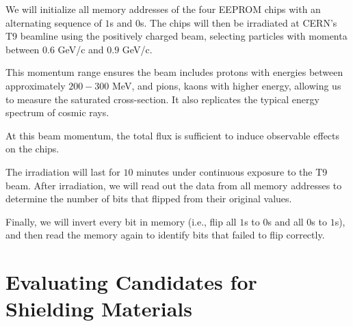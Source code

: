 \documentclass{article}
\begin{document}
We will initialize all memory addresses of the four EEPROM chips with an alternating sequence of $1$s and $0$s. The chips will then be 
irradiated at CERN's T9 beamline using the positively charged beam, 
selecting particles with momenta between $0.6$ GeV/$\mathrm{c}$ and $0.9$ GeV/$\mathrm{c}$. 

This momentum range ensures the beam includes protons with energies between approximately 
$200-300$ MeV, and pions, kaons with higher energy, allowing us to measure the saturated cross-section. 
It also replicates the typical energy spectrum of cosmic rays. 

At this beam momentum, the total flux is sufficient to induce observable effects on the chips. 

The irradiation will last for $10$ minutes under continuous exposure to the T9 beam. 
After irradiation, we will read out the data from all memory addresses to determine the number of bits that flipped from their original values.

Finally, we will invert every bit in memory (i.e., flip all $1$s to $0$s and all $0$s to $1$s), and then read the memory
again to identify bits that failed to flip correctly.

\section*{Evaluating Candidates for Shielding Materials}
\end{document}
